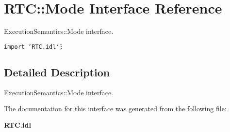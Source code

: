 \section{RTC::Mode Interface Reference}
\label{interfaceRTC_1_1Mode}
Execution\-Semantics::Mode interface.  


{\tt import \char`\"{}RTC.idl\char`\"{};}



\subsection{Detailed Description}
Execution\-Semantics::Mode interface. 



The documentation for this interface was generated from the following file:\begin{CompactItemize}
\item 
{\bf RTC.idl}\end{CompactItemize}
